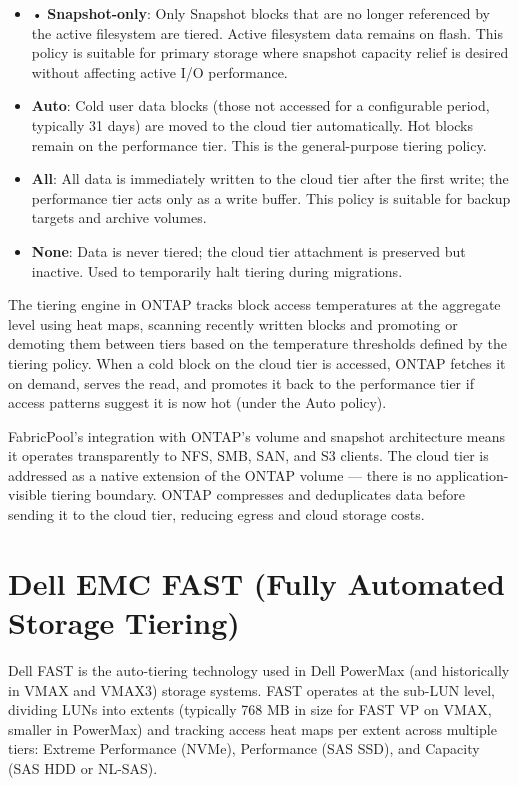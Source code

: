 \begin{itemize}
  \item • \textbf{Snapshot-only}: Only Snapshot blocks that are no longer referenced by the active filesystem are tiered. Active filesystem data remains on flash. This policy is suitable for primary storage where snapshot capacity relief is desired without affecting active I/O performance.
  \item \textbf{Auto}: Cold user data blocks (those not accessed for a configurable period, typically 31 days) are moved to the cloud tier automatically. Hot blocks remain on the performance tier. This is the general-purpose tiering policy.
  \item \textbf{All}: All data is immediately written to the cloud tier after the first write; the performance tier acts only as a write buffer. This policy is suitable for backup targets and archive volumes.
  \item \textbf{None}: Data is never tiered; the cloud tier attachment is preserved but inactive. Used to temporarily halt tiering during migrations.
\end{itemize}

The tiering engine in ONTAP tracks block access temperatures at the aggregate level using heat maps, scanning recently written blocks and promoting or demoting them between tiers based on the temperature thresholds defined by the tiering policy. When a cold block on the cloud tier is accessed, ONTAP fetches it on demand, serves the read, and promotes it back to the performance tier if access patterns suggest it is now hot (under the Auto policy).

FabricPool's integration with ONTAP's volume and snapshot architecture means it operates transparently to NFS, SMB, SAN, and S3 clients. The cloud tier is addressed as a native extension of the ONTAP volume --- there is no application-visible tiering boundary. ONTAP compresses and deduplicates data before sending it to the cloud tier, reducing egress and cloud storage costs.

\section{Dell EMC FAST (Fully Automated Storage Tiering)}
Dell FAST is the auto-tiering technology used in Dell PowerMax (and historically in VMAX and VMAX3) storage systems. FAST operates at the sub-LUN level, dividing LUNs into extents (typically 768 MB in size for FAST VP on VMAX, smaller in PowerMax) and tracking access heat maps per extent across multiple tiers: Extreme Performance (NVMe), Performance (SAS SSD), and Capacity (SAS HDD or NL-SAS).

